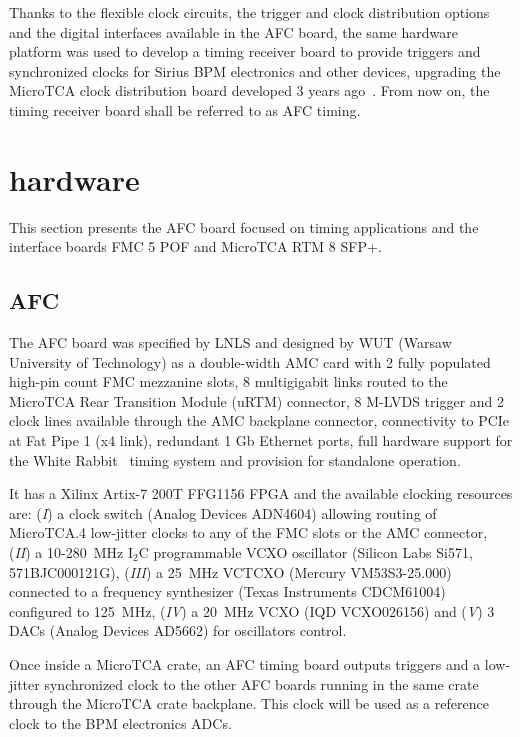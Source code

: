 \documentclass[a4paper,
               biblatex,      %
               ]{jacow}
\begin{document}
Thanks to the flexible clock circuits, the trigger and clock distribution options and the digital interfaces available in the AFC board, the same hardware platform was used to develop a timing receiver board to provide triggers and synchronized clocks for Sirius BPM electronics and other devices, upgrading the MicroTCA clock distribution board developed 3 years ago~\cite{timing_icalepcs15}. From now on, the timing receiver board shall be referred to as AFC timing. 

\section{hardware}
This section presents the AFC board focused on timing applications and the interface boards FMC 5 POF and MicroTCA RTM 8 SFP+.

\subsection{AFC}

The AFC board was specified by LNLS and designed by WUT (Warsaw University of Technology) as a double-width AMC card with 2 fully populated high-pin count FMC mezzanine slots, 8 multigigabit links routed to the MicroTCA Rear Transition Module (uRTM) connector, 8 M-LVDS trigger and 2 clock lines available through the AMC backplane connector, connectivity to PCIe at Fat Pipe 1 (x4 link), redundant 1 Gb Ethernet ports, full hardware support for the White Rabbit~\cite{white_rabbit} timing system and provision for standalone operation. 

It has a Xilinx Artix-7 200T FFG1156 FPGA and the available clocking resources are: (\textit{I}) a clock switch (Analog Devices ADN4604) allowing routing of MicroTCA.4 low-jitter clocks to any of the FMC slots or the AMC connector, (\textit{II}) a 10-280~MHz I$_{2}$C programmable VCXO oscillator (Silicon Labs Si571, 571BJC000121G), (\textit{III}) a 25~MHz VCTCXO (Mercury VM53S3-25.000) connected to a frequency synthesizer (Texas Instruments CDCM61004) configured to 125~MHz, (\textit{IV}) a 20~MHz VCXO (IQD VCXO026156) and (\textit{V}) 3 DACs (Analog Devices AD5662) for oscillators control. 

Once inside a MicroTCA crate, an AFC timing board outputs triggers and a low-jitter synchronized clock to the other AFC boards running in the same crate through the MicroTCA crate backplane. This clock will be used as a reference clock to the BPM electronics ADCs.
\end{document}
